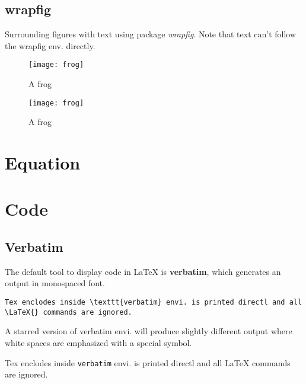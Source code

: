 \subsection{wrapfig}
Surrounding figures with text using package \emph{wrapfig}. Note
that text can't follow the wrapfig env. directly.

\begin{wrapfigure}{L}{0.3\textwidth}
    \centering 
    \texttt{[image: frog]}
    \caption{\label{fig:frog}A frog}
\end{wrapfigure}

\lipsum[1]

\begin{wrapfigure}{R}{0.3\textwidth}
    \centering 
    \texttt{[image: frog]}
    \caption{\label{fig:frog}A frog}
\end{wrapfigure}

\lipsum[2]


\section{Equation}

\section{Code}

\subsection{Verbatim}
The default tool to display code in \LaTeX{} is \textbf{verbatim}, which
generates an output in monospaced font. 
\begin{verbatim}
Tex enclodes inside \texttt{verbatim} envi. is printed directl and all
\LaTeX{} commands are ignored.
\end{verbatim}

A starred version of verbatim envi. will produce slightly different output
where white spaces are emphasized with a special symbol.
\begin{verbatim*}
Tex enclodes inside \texttt{verbatim} envi. is printed directl and all
\LaTeX{} commands are ignored.
\end{verbatim*}

